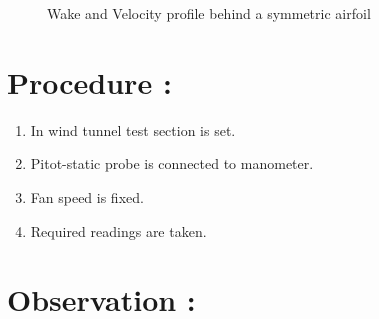 \documentclass[12pt,a4paper]{article}
\begin{document}
\begin{figure}[!ht]
	\begin{center}
	\end{center}
	\caption{Wake and Velocity profile behind a symmetric airfoil}
\end{figure}





\section{Procedure :}
\begin{enumerate}
    \item In wind tunnel test section is set.
    \item Pitot-static probe is connected to manometer.
    \item Fan speed is fixed.
    \item Required readings are taken.
\end{enumerate}






\section{Observation :}
\end{document}
